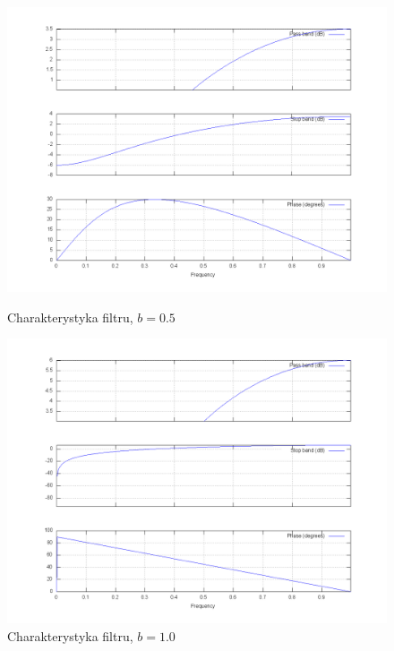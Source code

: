 \documentclass[wide,a4paper,titlepage,12pt]{mwart}
\begin{document}
  \begin{figure}[htbp]
    \begin{center}
      \includegraphics[scale=.3]{out/fig5.png}
      \caption{\label{fig5} Charakterystyka filtru, $b=0.5$}
      \includegraphics[scale=.3]{out/fig6.png}
      \caption{\label{fig6} Charakterystyka filtru, $b=1.0$}

    \end{center}
  \end{figure}
\end{document}
